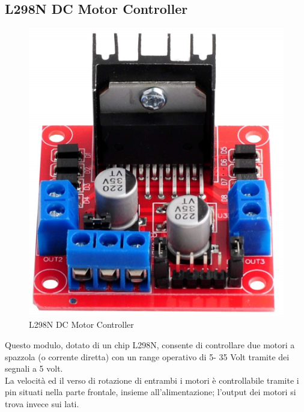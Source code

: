 \documentclass[12pt]{report}
\begin{document}
\newpage
\subsection*{L298N DC Motor Controller}
\begin{figure}
\vspace{-40pt}
\includegraphics[width=0.9\linewidth]{images/components/l298n.jpg} 
\caption{L298N DC Motor Controller}
\vspace{+40pt}
\label{fig:wrapfig}
\end{figure}
Questo modulo, dotato di un chip L298N, consente di controllare due motori a spazzola (o corrente diretta) con un range operativo di 5- 35 Volt tramite dei segnali a 5 volt.\\
La velocità ed il verso di rotazione di entrambi i motori è controllabile tramite i pin situati nella parte frontale, insieme all'alimentazione; l'output dei motori si trova invece sui lati.\\
\end{document}
